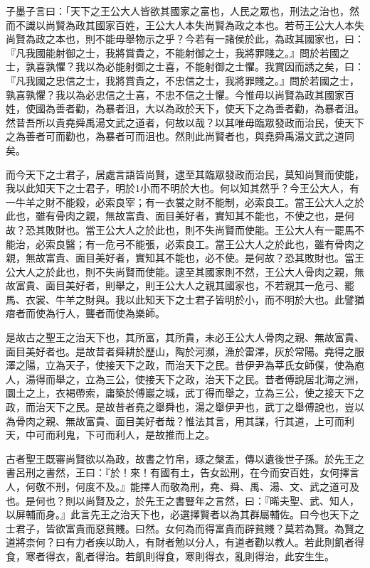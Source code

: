 
\begin{pinyinscope}
子墨子言曰：「天下之王公大人皆欲其國家之富也，人民之眾也，刑法之治也，然而不識以尚賢為政其國家百姓，王公大人本失尚賢為政之本也。若苟王公大人本失尚賢為政之本也，則不能毋舉物示之乎？今若有一諸侯於此，為政其國家也，曰：『凡我國能射御之士，我將賞貴之，不能射御之士，我將罪賤之。』問於若國之士，孰喜孰懼？我以為必能射御之士喜，不能射御之士懼。我賞因而誘之矣，曰：『凡我國之忠信之士，我將賞貴之，不忠信之士，我將罪賤之。』問於若國之士，孰喜孰懼？我以為必忠信之士喜，不忠不信之士懼。今惟毋以尚賢為政其國家百姓，使國為善者勸，為暴者沮，大以為政於天下，使天下之為善者勸，為暴者沮。然昔吾所以貴堯舜禹湯文武之道者，何故以哉？以其唯毋臨眾發政而治民，使天下之為善者可而勸也，為暴者可而沮也。然則此尚賢者也，與堯舜禹湯文武之道同矣。

而今天下之士君子，居處言語皆尚賢，逮至其臨眾發政而治民，莫知尚賢而使能，我以此知天下之士君子，明於1小而不明於大也。何以知其然乎？今王公大人，有一牛羊之財不能殺，必索良宰；有一衣裳之財不能制，必索良工。當王公大人之於此也，雖有骨肉之親，無故富貴、面目美好者，實知其不能也，不使之也，是何故？恐其敗財也。當王公大人之於此也，則不失尚賢而使能。王公大人有一罷馬不能治，必索良醫；有一危弓不能張，必索良工。當王公大人之於此也，雖有骨肉之親，無故富貴、面目美好者，實知其不能也，必不使。是何故？恐其敗財也。當王公大人之於此也，則不失尚賢而使能。逮至其國家則不然，王公大人骨肉之親，無故富貴、面目美好者，則舉之，則王公大人之親其國家也，不若親其一危弓、罷馬、衣裳、牛羊之財與。我以此知天下之士君子皆明於小，而不明於大也。此譬猶瘖者而使為行人，聾者而使為樂師。

是故古之聖王之治天下也，其所富，其所貴，未必王公大人骨肉之親、無故富貴、面目美好者也。是故昔者舜耕於歷山，陶於河瀕，漁於雷澤，灰於常陽。堯得之服澤之陽，立為天子，使接天下之政，而治天下之民。昔伊尹為莘氏女師僕，使為庖人，湯得而舉之，立為三公，使接天下之政，治天下之民。昔者傅說居北海之洲，圜土之上，衣褐帶索，庸築於傅巖之城，武丁得而舉之，立為三公，使之接天下之政，而治天下之民。是故昔者堯之舉舜也，湯之舉伊尹也，武丁之舉傅說也，豈以為骨肉之親、無故富貴、面目美好者哉？惟法其言，用其謀，行其道，上可而利天，中可而利鬼，下可而利人，是故推而上之。

古者聖王既審尚賢欲以為政，故書之竹帛，琢之槃盂，傳以遺後世子孫。於先王之書呂刑之書然，王曰：『於！來！有國有土，告女訟刑，在今而安百姓，女何擇言人，何敬不刑，何度不及。』能擇人而敬為刑，堯、舜、禹、湯、文、武之道可及也。是何也？則以尚賢及之，於先王之書豎年之言然，曰：『晞夫聖、武、知人，以屏輔而身。』此言先王之治天下也，必選擇賢者以為其群屬輔佐。曰今也天下之士君子，皆欲富貴而惡貧賤。曰然。女何為而得富貴而辟貧賤？莫若為賢。為賢之道將柰何？曰有力者疾以助人，有財者勉以分人，有道者勸以教人。若此則飢者得食，寒者得衣，亂者得治。若飢則得食，寒則得衣，亂則得治，此安生生。


\end{pinyinscope}

